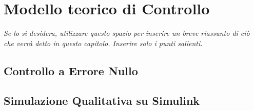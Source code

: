 \chapter{Modello teorico di Controllo}\label{controlModel}

\begin{minipage}{12cm}\textit{Se lo si desidera, utilizzare questo spazio per inserire un breve riassunto di ci\`o che verr\`a detto in questo capitolo. Inserire solo i punti salienti.}
\end{minipage}

\vspace*{1cm}



\section{Controllo a Errore Nullo}

\section{Simulazione Qualitativa su Simulink}